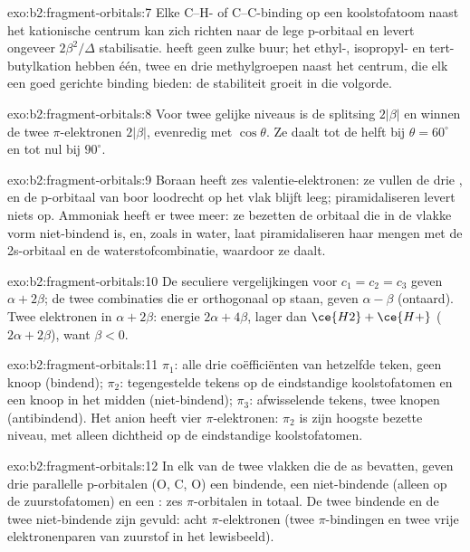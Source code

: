 \begin{solution}{exo:b2:fragment-orbitals:7}
Elke C--H- of C--C-binding op een koolstofatoom naast het kationische centrum kan zich richten naar de
lege p-orbitaal en levert ongeveer $2\beta^2/\Delta$ stabilisatie.  heeft geen zulke
buur; het ethyl-, isopropyl- en tert-butylkation hebben één, twee en drie methylgroepen
naast het centrum, die elk een goed gerichte binding bieden: de stabiliteit groeit in die
volgorde.
\end{solution}

\begin{solution}{exo:b2:fragment-orbitals:8}
Voor twee gelijke niveaus is de splitsing $2|\beta|$ en winnen de twee $\pi$-elektronen $2|\beta|$,
evenredig met $\cos\theta$. Ze daalt tot de helft bij $\theta = 60^\circ$ en tot nul bij
$90^\circ$.
\end{solution}

\begin{solution}{exo:b2:fragment-orbitals:9}
Boraan heeft zes valentie-elektronen: ze vullen de drie , en de p-orbitaal
van boor loodrecht op het vlak blijft leeg; piramidaliseren levert niets op.
Ammoniak heeft er twee meer: ze bezetten de orbitaal die in de vlakke vorm niet-bindend is, en,
zoals in water, laat piramidaliseren haar mengen met de 2s-orbitaal en
de waterstofcombinatie, waardoor ze daalt.
\end{solution}

\begin{solution}{exo:b2:fragment-orbitals:10}
De seculiere vergelijkingen voor $c_1 = c_2 = c_3$ geven $\alpha + 2\beta$; de twee combinaties
die er orthogonaal op staan, geven $\alpha - \beta$ (ontaard). Twee elektronen in $\alpha + 2\beta$: energie
$2\alpha + 4\beta$, lager dan $\ce{H2} + \ce{H+}$ ($2\alpha + 2\beta$), want $\beta < 0$.
\end{solution}

\begin{solution}{exo:b2:fragment-orbitals:11}
$\pi_1$: alle drie coëfficiënten van hetzelfde teken, geen knoop (bindend); $\pi_2$: tegengestelde tekens
op de eindstandige koolstofatomen en een knoop in het midden (niet-bindend); $\pi_3$: afwisselende
tekens, twee knopen (antibindend). Het anion heeft vier $\pi$-elektronen: $\pi_2$ is zijn
hoogste bezette niveau, met alleen dichtheid op de eindstandige koolstofatomen.
\end{solution}

\begin{solution}{exo:b2:fragment-orbitals:12}
In elk van de twee vlakken die de as bevatten, geven drie parallelle p-orbitalen (O, C, O)
een bindende, een niet-bindende (alleen op de zuurstofatomen) en een : zes
$\pi$-orbitalen in totaal. De twee bindende en de twee niet-bindende zijn gevuld: acht
$\pi$-elektronen (twee $\pi$-bindingen en twee vrije elektronenparen van zuurstof in het lewisbeeld).
\end{solution}

